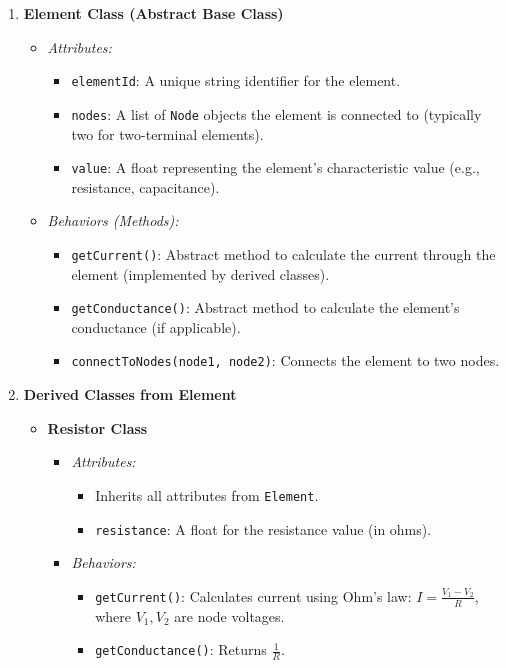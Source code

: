 \documentclass{article}
\begin{document}
\begin{enumerate}
    \item \textbf{Element Class (Abstract Base Class)}
    \begin{itemize}
        \item \textit{Attributes:}
        \begin{itemize}
            \item \texttt{elementId}: A unique string identifier for the element.
            \item \texttt{nodes}: A list of \texttt{Node} objects the element is connected to (typically two for two-terminal elements).
            \item \texttt{value}: A float representing the element’s characteristic value (e.g., resistance, capacitance).
        \end{itemize}
        \item \textit{Behaviors (Methods):}
        \begin{itemize}
            \item \texttt{getCurrent()}: Abstract method to calculate the current through the element (implemented by derived classes).
            \item \texttt{getConductance()}: Abstract method to calculate the element’s conductance (if applicable).
            \item \texttt{connectToNodes(node1, node2)}: Connects the element to two nodes.
        \end{itemize}
    \end{itemize}

    \item \textbf{Derived Classes from Element}
    \begin{itemize}
        \item \textbf{Resistor Class}
        \begin{itemize}
            \item \textit{Attributes:}
            \begin{itemize}
                \item Inherits all attributes from \texttt{Element}.
                \item \texttt{resistance}: A float for the resistance value (in ohms).
            \end{itemize}
            \item \textit{Behaviors:}
            \begin{itemize}
                \item \texttt{getCurrent()}: Calculates current using Ohm’s law: \( I = \frac{V_1 - V_2}{R} \), where \( V_1, V_2 \) are node voltages.
                \item \texttt{getConductance()}: Returns \( \frac{1}{R} \).
            \end{itemize}
        \end{itemize}


\end{itemize}
\end{enumerate}
\end{document}
